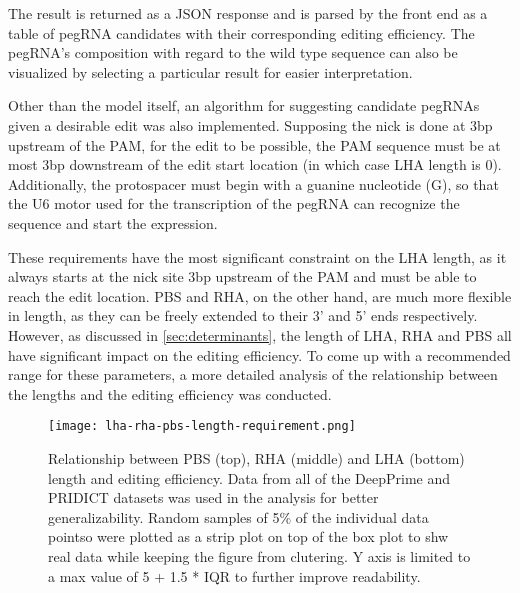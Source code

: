 The result is returned as a JSON response and is parsed by the front end as a table of pegRNA candidates with their corresponding editing efficiency. The pegRNA's composition with regard to the wild type sequence can also be visualized by selecting a particular result for easier interpretation.

Other than the model itself, an algorithm for suggesting candidate pegRNAs given a desirable edit was also implemented. Supposing the nick is done at 3bp upstream of the PAM, for the edit to be possible, the PAM sequence must be at most 3bp downstream of the edit start location (in which case LHA length is 0). Additionally, the protospacer must begin with a guanine nucleotide (G), so that the U6 motor used for the transcription of the pegRNA can recognize the sequence and start the expression\cite{hsieh-fengEfficientExpressionMultiple2020}.

These requirements have the most significant constraint on the LHA length, as it always starts at the nick site 3bp upstream of the PAM and must be able to reach the edit location. PBS and RHA, on the other hand, are much more flexible in length, as they can be freely extended to their 3' and 5' ends respectively.
However, as discussed in \autoref{sec:determinants}, the length of LHA, RHA and PBS all have significant impact on the editing efficiency. To come up with a recommended range for these parameters, a more detailed analysis of the relationship between the lengths and the editing efficiency was conducted.

\begin{figure}
    \texttt{[image: lha-rha-pbs-length-requirement.png]}
    \caption[Relationship between LHA, RHA and PBS length and editing efficiency]{Relationship between PBS (top), RHA (middle) and LHA (bottom) length and editing efficiency. Data from all of the DeepPrime and PRIDICT datasets was used in the analysis for better generalizability. Random samples of 5\% of the individual data pointso were plotted as a strip plot on top of the box plot to shw real data while keeping the figure from clutering. Y axis is limited to a max value of 5 + 1.5 * IQR to further improve readability. }
    \label{fig:lha-rha-pbs-length}
\end{figure}


